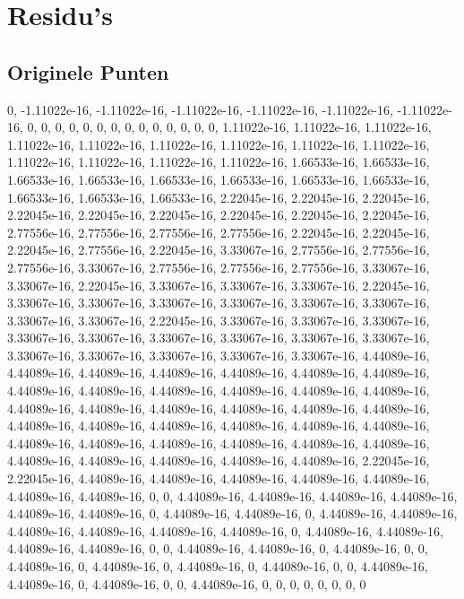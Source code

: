 \documentclass[10pt,a4paper,twocolumn]{article}
\begin{document}
\section{Residu's}
\subsection{Originele Punten}
0, -1.11022e-16, -1.11022e-16, -1.11022e-16, -1.11022e-16, -1.11022e-16, -1.11022e-16, 0, 0, 0, 0, 0, 0, 0, 0, 0, 0, 0, 0, 0, 0, 1.11022e-16, 1.11022e-16, 1.11022e-16, 1.11022e-16, 1.11022e-16, 1.11022e-16, 1.11022e-16, 1.11022e-16, 1.11022e-16, 1.11022e-16, 1.11022e-16, 1.11022e-16, 1.11022e-16, 1.66533e-16, 1.66533e-16, 1.66533e-16, 1.66533e-16, 1.66533e-16, 1.66533e-16, 1.66533e-16, 1.66533e-16, 1.66533e-16, 1.66533e-16, 1.66533e-16, 2.22045e-16, 2.22045e-16, 2.22045e-16, 2.22045e-16, 2.22045e-16, 2.22045e-16, 2.22045e-16, 2.22045e-16, 2.22045e-16, 2.77556e-16, 2.77556e-16, 2.77556e-16, 2.77556e-16, 2.22045e-16, 2.22045e-16, 2.22045e-16, 2.77556e-16, 2.22045e-16, 3.33067e-16, 2.77556e-16, 2.77556e-16, 2.77556e-16, 3.33067e-16, 2.77556e-16, 2.77556e-16, 2.77556e-16, 3.33067e-16, 3.33067e-16, 2.22045e-16, 3.33067e-16, 3.33067e-16, 3.33067e-16, 2.22045e-16, 3.33067e-16, 3.33067e-16, 3.33067e-16, 3.33067e-16, 3.33067e-16, 3.33067e-16, 3.33067e-16, 3.33067e-16, 2.22045e-16, 3.33067e-16, 3.33067e-16, 3.33067e-16, 3.33067e-16, 3.33067e-16, 3.33067e-16, 3.33067e-16, 3.33067e-16, 3.33067e-16, 3.33067e-16, 3.33067e-16, 3.33067e-16, 3.33067e-16, 3.33067e-16, 4.44089e-16, 4.44089e-16, 4.44089e-16, 4.44089e-16, 4.44089e-16, 4.44089e-16, 4.44089e-16, 4.44089e-16, 4.44089e-16, 4.44089e-16, 4.44089e-16, 4.44089e-16, 4.44089e-16, 4.44089e-16, 4.44089e-16, 4.44089e-16, 4.44089e-16, 4.44089e-16, 4.44089e-16, 4.44089e-16, 4.44089e-16, 4.44089e-16, 4.44089e-16, 4.44089e-16, 4.44089e-16, 4.44089e-16, 4.44089e-16, 4.44089e-16, 4.44089e-16, 4.44089e-16, 4.44089e-16, 4.44089e-16, 4.44089e-16, 4.44089e-16, 4.44089e-16, 4.44089e-16, 2.22045e-16, 2.22045e-16, 4.44089e-16, 4.44089e-16, 4.44089e-16, 4.44089e-16, 4.44089e-16, 4.44089e-16, 4.44089e-16, 0, 0, 4.44089e-16, 4.44089e-16, 4.44089e-16, 4.44089e-16, 4.44089e-16, 4.44089e-16, 0, 4.44089e-16, 4.44089e-16, 0, 4.44089e-16, 4.44089e-16, 4.44089e-16, 4.44089e-16, 4.44089e-16, 4.44089e-16, 0, 4.44089e-16, 4.44089e-16, 4.44089e-16, 4.44089e-16, 0, 0, 4.44089e-16, 4.44089e-16, 0, 4.44089e-16, 0, 0, 4.44089e-16, 0, 4.44089e-16, 0, 4.44089e-16, 0, 4.44089e-16, 0, 0, 4.44089e-16, 4.44089e-16, 0, 4.44089e-16, 0, 0, 4.44089e-16, 0, 0, 0, 0, 0, 0, 0, 0
\end{document}
